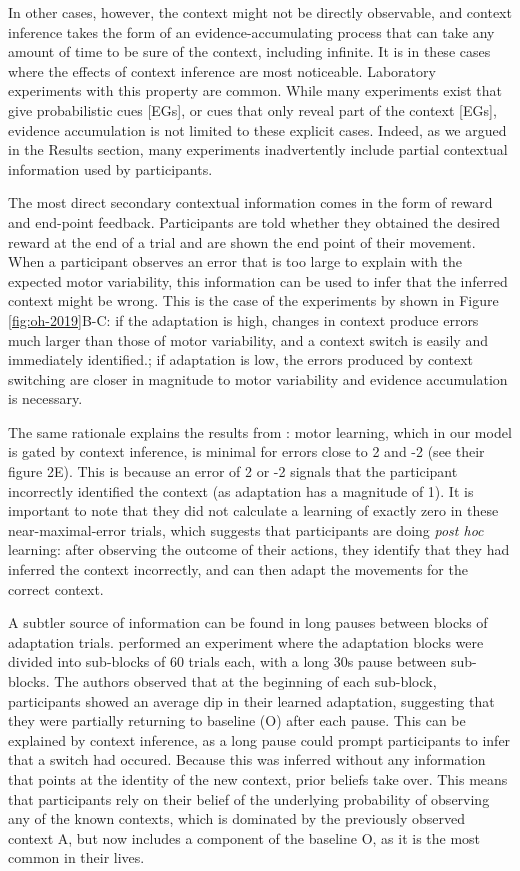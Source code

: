 \documentclass[a4paper,doc,floatsintext,natbib]{apa6}
\def \fref #1{Figure \ref{#1}}     %
\begin{document}
In other cases, however, the context might not be directly observable, and context inference takes the form of an evidence-accumulating process that can take any amount of time to be sure of the context, including infinite. It is in these cases where the effects of context inference are most noticeable. Laboratory experiments with this property are common. While many experiments exist that give probabilistic cues [EGs], or cues that only reveal part of the context [EGs], evidence accumulation is not limited to these explicit cases. Indeed, as we argued in the Results section, many experiments inadvertently include partial contextual information used by participants.

The most direct secondary contextual information comes in the form of reward and end-point feedback. Participants are told whether they obtained the desired reward at the end of a trial and are shown the end point of their movement. When a participant observes an error that is too large to explain with the expected motor variability, this information can be used to infer that the inferred context might be wrong. This is the case of the experiments by \cite{Oh_Minimizing_2019} shown in \fref{fig:oh-2019}B-C: if the adaptation is high, changes in context produce errors much larger than those of motor variability, and a context switch is easily and immediately identified.; if adaptation is low, the errors produced by context switching are closer in magnitude to motor variability and evidence accumulation is necessary.

The same rationale explains the results from \cite{Davidson_Scaling_2004}: motor learning, which in our model is gated by context inference, is minimal for errors close to 2 and -2 (see their figure 2E). This is because an error of 2 or -2 signals that the participant incorrectly identified the context (as adaptation has a magnitude of 1). It is important to note that they did not calculate a learning of exactly zero in these near-maximal-error trials, which suggests that participants are doing \textit{post hoc} learning: after observing the outcome of their actions, they identify that they had inferred the context incorrectly, and can then adapt the movements for the correct context.

A subtler source of information can be found in long pauses between blocks of adaptation trials. \cite{Ethier_Spontaneous_2008} performed an experiment where the adaptation blocks were divided into sub-blocks of 60 trials each, with a long 30s pause between sub-blocks. The authors observed that at the beginning of each sub-block, participants showed an average dip in their learned adaptation, suggesting that they were partially returning to baseline (O) after each pause. This can be explained by context inference, as a long pause could prompt participants to infer that a switch had occured. Because this was inferred without any information that points at the identity of the new context, prior beliefs take over. This means that participants rely on their belief of the underlying probability of observing any of the known contexts, which is dominated by the previously observed context A, but now includes a component of the baseline O, as it is the most common in their lives.
\end{document}
